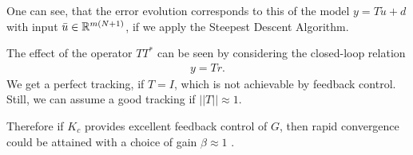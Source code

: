 One can see, that the error evolution corresponds to this of the model $y = T \tilde{u} + d$ with input $\bar {u} 
\in {\mathbb{R}}^{m(N+1)}$, if we apply the Steepest Descent Algorithm.

The effect of the operator $T T^*$ can be seen by considering the closed-loop relation 
\begin{align}
y = Tr.
\end{align}
We get a perfect tracking, if $T = I$, which is not achievable by feedback control. Still, we can assume a good tracking if $||T|| \approx 1$. 

Therefore if $K_c$ provides excellent feedback control of $G$, then rapid convergence could be attained with a choice of gain $\beta \approx 1$ \cite{ILC}. %








